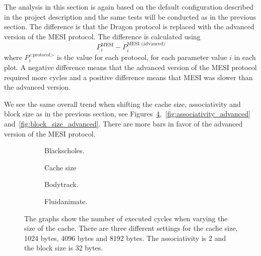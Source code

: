The analysis in this section is again based on the default configuration described in
the project description and the same tests will be conducted as in the previous
section. The difference is that the Dragon protocol is replaced with the
advanced version of the MESI protocol. The difference is calculated using
\[
    P^\text{MESI}_i - P^\text{MESI (advanced)}_i
\]
where $ P^\text{<protocol>}_i $ is the value for each protocol, for each
parameter value $i$ in each plot. A negative difference means that the advanced
version of the MESI protocol required more cycles and a positive difference means
that MESI was slower than the advanced version.

We see the same overall trend when shifting the cache size, associativity and block size
as in the previous section, see
Figures~\ref{fig:cache_size_advanced},~\ref{fig:associativity_advanced} and~\ref{fig:block_size_advanced}. There are more
bars in favor of the advanced version of the MESI protocol.


\begin{figure}[H]
    \centering
    \begin{subfigure}[b]{0.33\textwidth}
        \centering
        \caption{Blackscholes.}\label{fig:cache_size_blackscholes_advanced}
    \end{subfigure}%
    \hfill
    \begin{subfigure}[b]{0.33\textwidth}
        \centering
        Cache size\par\medskip
        \caption{Bodytrack.}\label{fig:cache_size_bodytrack_advanced}
    \end{subfigure}%
    \hfill
    \begin{subfigure}[b]{0.33\textwidth}
        \centering
        \caption{Fluidanimate.}\label{fig:cache_size_fluidanimate_advanced}
    \end{subfigure}
    \hfill
    \caption{The graphs show the number of executed cycles when varying the size of the cache. There are three different settings for the cache size, 1024 bytes, 4096 bytes and 8192 bytes. The associativity is 2 and the block size is 32 bytes.}\label{fig:cache_size_advanced}
\end{figure}

